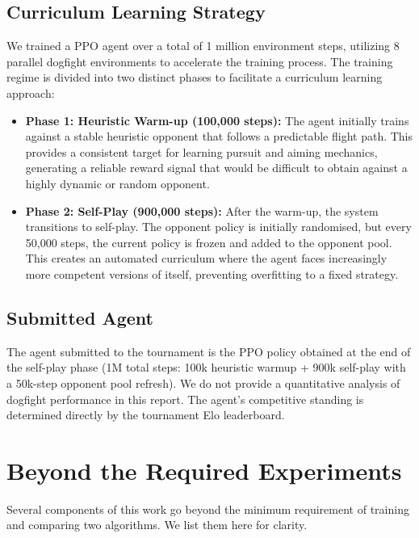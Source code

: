 \documentclass[11pt,a4paper]{article}
\begin{document}
\subsection{Curriculum Learning Strategy}

We trained a PPO agent over a total of 1 million environment steps, utilizing 8 parallel dogfight environments to accelerate the training process. The training regime is divided into two distinct phases to facilitate a curriculum learning approach:

\begin{itemize}
    \item \textbf{Phase 1: Heuristic Warm-up (100,000 steps):} The agent initially trains against a stable heuristic opponent that follows a predictable flight path. This provides a consistent target for learning pursuit and aiming mechanics, generating a reliable reward signal that would be difficult to obtain against a highly dynamic or random opponent.

    \item \textbf{Phase 2: Self-Play (900,000 steps):} After the warm-up, the system transitions to self-play. The opponent policy is initially randomised, but every 50,000 steps, the current policy is frozen and added to the opponent pool. This creates an automated curriculum where the agent faces increasingly more competent versions of itself, preventing overfitting to a fixed strategy.
\end{itemize}

\subsection{Submitted Agent}

The agent submitted to the tournament is the PPO policy obtained at the end of the
self-play phase (1M total steps: 100k heuristic warmup + 900k self-play with a
50k-step opponent pool refresh). We do not provide a quantitative analysis of dogfight
performance in this report. The agent's competitive standing is determined directly
by the tournament Elo leaderboard.

\section{Beyond the Required Experiments}

Several components of this work go beyond the minimum requirement of training and
comparing two algorithms. We list them here for clarity.
\end{document}
